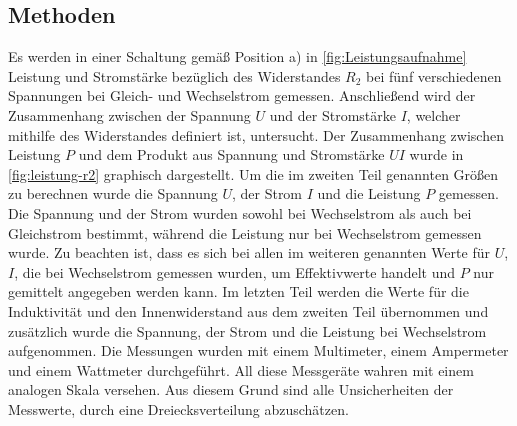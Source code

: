 \subsection{Methoden}\label{kap:MethodenS}
Es werden in einer Schaltung gemäß Position a) in \cref{fig:Leistungsaufnahme} Leistung und Stromstärke bezüglich des Widerstandes $R_2$ bei fünf verschiedenen Spannungen bei Gleich- und Wechselstrom gemessen.
Anschließend wird der Zusammenhang zwischen der Spannung $U$ und der Stromstärke $I$, welcher mithilfe des Widerstandes definiert ist, untersucht.
Der Zusammenhang zwischen Leistung $P$ und dem Produkt aus Spannung und Stromstärke $UI$ wurde in \cref{fig:leistung-r2} graphisch dargestellt.
Um die im zweiten Teil genannten Größen zu berechnen wurde die Spannung $U$, der Strom $I$ und die Leistung $P$ gemessen. 
Die Spannung und der Strom wurden sowohl bei Wechselstrom als auch bei Gleichstrom bestimmt, während die Leistung nur bei Wechselstrom gemessen wurde. Zu beachten ist, dass es sich bei allen im weiteren genannten Werte für $U$, $I$, die bei Wechselstrom gemessen wurden, um Effektivwerte handelt und $P$ nur gemittelt angegeben werden kann.
Im letzten Teil werden die Werte für die Induktivität und den Innenwiderstand aus dem zweiten Teil übernommen und zusätzlich wurde die Spannung, der Strom und die Leistung bei Wechselstrom aufgenommen.
Die Messungen wurden mit einem Multimeter, einem Ampermeter und einem Wattmeter durchgeführt.
All diese Messgeräte wahren mit einem analogen Skala versehen. Aus diesem Grund sind alle Unsicherheiten der Messwerte, durch eine Dreiecksverteilung abzuschätzen. 
